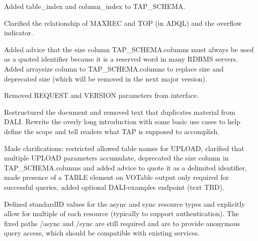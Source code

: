 \documentclass[11pt,letter]{ivoa}
\begin{document}
Added table\_index and column\_index to TAP\_SCHEMA.

Clarified the relationship of MAXREC and TOP (in ADQL) and the overflow 
indicator.

Added advice that the size column TAP\_SCHEMA.columns must always be used 
as a quoted identifier because it is a reserved word in many RDBMS 
servers. Added arraysize column to TAP\_SCHEMA.columns to replace size and 
deprecated size (which will be removed in the next major version).
 
Removed REQUEST and VERSION parameters from interface.

Restructured the document and removed text that duplicates material from DALI. 
Rewrite the overly long introduction with some basic use cases to help define 
the scope and tell readers what TAP is supposed to accomplish.

Made clarifications: restricted allowed table names for UPLOAD, clarified that 
multiple UPLOAD parameters accumulate, deprecated the size column in 
TAP\_SCHEMA.columns and added advice to quote it as a delimited 
identifier, made presence of a TABLE element on VOTable output only required for 
successful queries, added optional DALI-examples endpoint (text TBD).

Defined standardID values for the async and sync resource types and explicitly 
allow for multiple of each resource (typically to support authentication). The 
fixed paths /async and /sync are still required and are to provide anonymous 
query access, which should be compatible with existing services.


\end{document}
